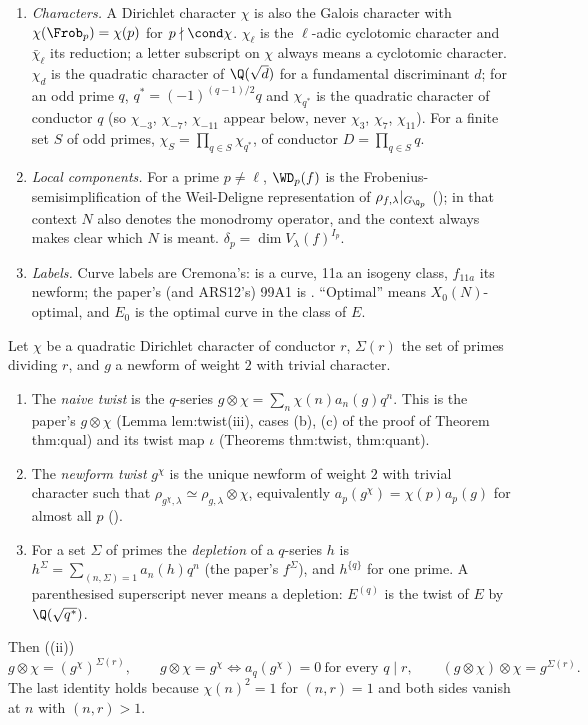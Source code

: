 \begin{convention}
\begin{enumerate}[label=(\alph*)]
\item \emph{Characters.} A Dirichlet character $\chi$ is also the Galois character with $\chi(\Frob_p)=\chi(p)$ for $p\nmid\cond\chi$. $\chi_\ell$ is the $\ell$-adic
cyclotomic character and $\bar\chi_\ell$ its reduction; a letter subscript on $\chi$ always means a cyclotomic character. $\chi_d$ is the quadratic
character of $\Q(\sqrt d)$ for a fundamental discriminant $d$; for an odd prime $q$, $q^*=(-1)^{(q-1)/2}q$ and $\chi_{q^*}$ is the quadratic character of
conductor $q$ (so $\chi_{-3}$, $\chi_{-7}$, $\chi_{-11}$ appear below, never $\chi_3$, $\chi_7$, $\chi_{11}$). For a finite set $S$ of odd primes,
$\chi_S=\prod_{q\in S}\chi_{q^*}$, of conductor $D=\prod_{q\in S}q$.
\item \emph{Local components.} For a prime $p\ne\ell$, $\WD_p(f)$ is the Frobenius-semisimplification of the Weil-Deligne representation of
$\rho_{f,\lambda}|_{G_{\Q_p}}$ (); in that context $N$ also denotes the monodromy operator, and the context always makes clear which $N$
is meant. $\delta_p=\dim V_\lambda(f)^{I_p}$.
\item \emph{Labels.} Curve labels are Cremona's:  is a curve, 11a an isogeny class, $f_{11a}$ its newform; the paper's (and ARS12's)
99A1 is . ``Optimal'' means $X_0(N)$-optimal, and $E_0$ is the optimal curve in the class of $E$.
\end{enumerate}
\end{convention}

\begin{convention}\label{conv:modgalrep:twists}
Let $\chi$ be a quadratic Dirichlet character of conductor $r$, $\Sigma(r)$ the set of primes dividing $r$, and $g$ a newform of weight $2$ with
trivial character.
\begin{enumerate}[label=(\alph*)]
\item The \emph{naive twist} is the $q$-series $g\otimes\chi=\sum_n\chi(n)a_n(g)q^n$. This is the paper's $g\otimes\chi$ (Lemma lem:twist(iii), cases (b), (c) of the
proof of Theorem thm:qual) and its twist map $\iota$ (Theorems thm:twist, thm:quant).
\item The \emph{newform twist} $g^\chi$ is the unique newform of weight $2$ with trivial character such that $\rho_{g^\chi,\lambda}\simeq\rho_{g,\lambda}\otimes\chi$, equivalently
$a_p(g^\chi)=\chi(p)a_p(g)$ for almost all $p$ ().
\item For a set $\Sigma$ of primes the \emph{depletion} of a $q$-series $h$ is $h^\Sigma=\sum_{(n,\Sigma)=1}a_n(h)q^n$ (the paper's $f^\Sigma$), and $h^{\{q\}}$ for one prime.
A parenthesised superscript never means a depletion: $E^{(q)}$ is the twist of $E$ by $\Q(\sqrt{q^*})$.
\end{enumerate}
Then ((ii))
\[
g\otimes\chi=(g^\chi)^{\Sigma(r)},\qquad g\otimes\chi=g^\chi\iff a_q(g^\chi)=0\ \text{for every } q\mid r,\qquad (g\otimes\chi)\otimes\chi=g^{\Sigma(r)} .
\]
The last identity holds because $\chi(n)^2=1$ for $(n,r)=1$ and both sides vanish at $n$ with $(n,r)>1$.
\end{convention}

